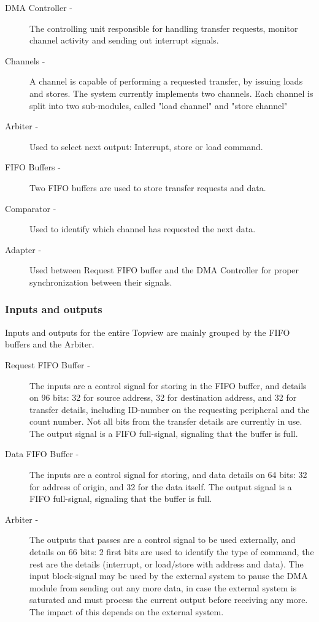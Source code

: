 \begin{appendix}
\begin{description}
    \item[DMA Controller -] 
    The controlling unit responsible for handling transfer requests, monitor channel activity and sending out interrupt signals.
    \item[Channels -] 
    A channel is capable of performing a requested transfer, by issuing loads and stores.
    The system currently implements two channels.
    Each channel is split into two sub-modules, called "load channel" and "store channel"
    \item[Arbiter -]
    Used to select next output: Interrupt, store or load command.     
    \item[FIFO Buffers -]
    Two FIFO buffers are used to store transfer requests and data.
    \item[Comparator -]
    Used to identify which channel has requested the next data.
    \item[Adapter -]
    Used between Request FIFO buffer and the DMA Controller for proper synchronization between their signals.  
\end{description}

\subsubsection{Inputs and outputs}
Inputs and outputs for the entire Topview are mainly grouped by the FIFO buffers and the Arbiter.
\begin{description}
    \item[Request FIFO Buffer -] 
    The inputs are a control signal for storing in the FIFO buffer, and details on 96 bits: 32 for source address, 32 for destination address, and 32 for transfer details, including ID-number on the requesting peripheral and the count number. 
    Not all bits from the transfer details are currently in use.
    The output signal is a FIFO full-signal, signaling that the buffer is full.
    \item[Data FIFO Buffer -] 
    The inputs are a control signal for storing, and data details on 64 bits: 32 for address of origin, and 32 for the data itself.
    The output signal is a FIFO full-signal, signaling that the buffer is full.
    \item[Arbiter -]
    The outputs that passes are a control signal to be used externally, and details on 66 bits: 2 first bits are used to identify the type of command, the rest are the details (interrupt, or load/store with address and data).
    The input block-signal may be used by the external system to pause the DMA module from sending out any more data, in case the external system is saturated and must process the current output before receiving any more. 
    The impact of this depends on the external system.
\end{description}


\end{appendix}

